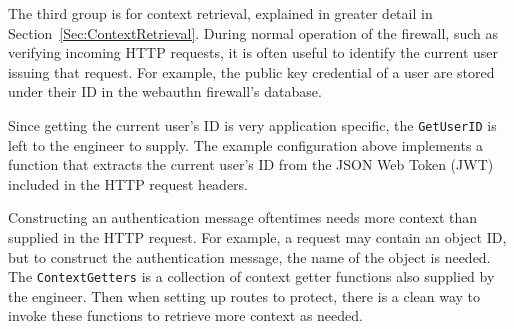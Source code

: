 


The third group is for context retrieval, explained in greater detail in Section~\ref{Sec:ContextRetrieval}. During normal operation of the firewall, such as verifying incoming HTTP requests, it is often useful to identify the current user issuing that request. For example, the public key credential of a user are stored under their ID in the webauthn firewall's database. 

Since getting the current user's ID is very application specific, the \lstinline{GetUserID} is left to the engineer to supply. The example configuration above implements a function that extracts the current user's ID from the JSON Web Token (JWT) included in the HTTP request headers.

Constructing an authentication message oftentimes needs more context than supplied in the HTTP request. For example, a request may contain an object ID, but to construct the authentication message, the name of the object is needed. The \lstinline{ContextGetters} is a collection of context getter functions also supplied by the engineer. Then when setting up routes to protect, there is a clean way to invoke these functions to retrieve more context as needed.



